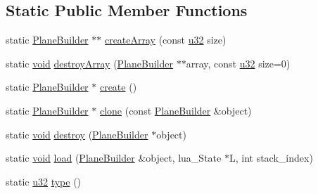 \subsection*{Static Public Member Functions}
\begin{DoxyCompactItemize}
\item 
static \mbox{\hyperlink{classnjli_1_1_plane_builder}{Plane\+Builder}} $\ast$$\ast$ \mbox{\hyperlink{classnjli_1_1_plane_builder_a8ccda78e11dc743eac59119d6447f629}{create\+Array}} (const \mbox{\hyperlink{_util_8h_a10e94b422ef0c20dcdec20d31a1f5049}{u32}} size)
\item 
static \mbox{\hyperlink{_thread_8h_af1e856da2e658414cb2456cb6f7ebc66}{void}} \mbox{\hyperlink{classnjli_1_1_plane_builder_a17452a7478fdf3290fb050f1cf94b5fe}{destroy\+Array}} (\mbox{\hyperlink{classnjli_1_1_plane_builder}{Plane\+Builder}} $\ast$$\ast$array, const \mbox{\hyperlink{_util_8h_a10e94b422ef0c20dcdec20d31a1f5049}{u32}} size=0)
\item 
static \mbox{\hyperlink{classnjli_1_1_plane_builder}{Plane\+Builder}} $\ast$ \mbox{\hyperlink{classnjli_1_1_plane_builder_ac9fc17fac1451f36137b88c11866a55e}{create}} ()
\item 
static \mbox{\hyperlink{classnjli_1_1_plane_builder}{Plane\+Builder}} $\ast$ \mbox{\hyperlink{classnjli_1_1_plane_builder_ad187a59e424005f39f7b33bb4523226d}{clone}} (const \mbox{\hyperlink{classnjli_1_1_plane_builder}{Plane\+Builder}} \&object)
\item 
static \mbox{\hyperlink{_thread_8h_af1e856da2e658414cb2456cb6f7ebc66}{void}} \mbox{\hyperlink{classnjli_1_1_plane_builder_a07ea1c08008e7734b4c99a60634c5c20}{destroy}} (\mbox{\hyperlink{classnjli_1_1_plane_builder}{Plane\+Builder}} $\ast$object)
\item 
static \mbox{\hyperlink{_thread_8h_af1e856da2e658414cb2456cb6f7ebc66}{void}} \mbox{\hyperlink{classnjli_1_1_plane_builder_ae590dbe5b5be6f890ed16d1e15002eb6}{load}} (\mbox{\hyperlink{classnjli_1_1_plane_builder}{Plane\+Builder}} \&object, lua\+\_\+\+State $\ast$L, int stack\+\_\+index)
\item 
static \mbox{\hyperlink{_util_8h_a10e94b422ef0c20dcdec20d31a1f5049}{u32}} \mbox{\hyperlink{classnjli_1_1_plane_builder_ae22f7828d8b9e4c0f8257dea57a52edc}{type}} ()
\end{DoxyCompactItemize}
